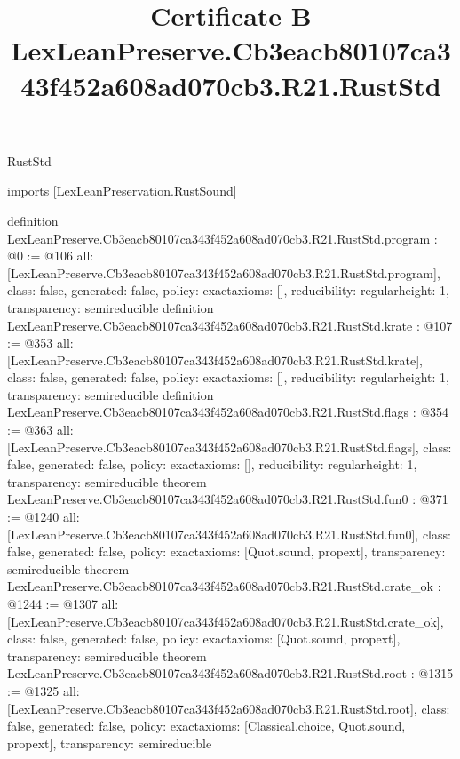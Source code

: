 \begin{lexlean}{RustStd}
\title{Certificate B LexLeanPreserve.Cb3eacb80107ca343f452a608ad070cb3.R21.RustStd}
\begin{coremodule}
imports [LexLeanPreservation.RustSound]

definition LexLeanPreserve.Cb3eacb80107ca343f452a608ad070cb3.R21.RustStd.program : @0 := @106 {
  all: [LexLeanPreserve.Cb3eacb80107ca343f452a608ad070cb3.R21.RustStd.program],
  class: false,
  generated: false,
  policy: exact{axioms: []},
  reducibility: regular{height: 1},
  transparency: semireducible
}
definition LexLeanPreserve.Cb3eacb80107ca343f452a608ad070cb3.R21.RustStd.krate : @107 := @353 {
  all: [LexLeanPreserve.Cb3eacb80107ca343f452a608ad070cb3.R21.RustStd.krate],
  class: false,
  generated: false,
  policy: exact{axioms: []},
  reducibility: regular{height: 1},
  transparency: semireducible
}
definition LexLeanPreserve.Cb3eacb80107ca343f452a608ad070cb3.R21.RustStd.flags : @354 := @363 {
  all: [LexLeanPreserve.Cb3eacb80107ca343f452a608ad070cb3.R21.RustStd.flags],
  class: false,
  generated: false,
  policy: exact{axioms: []},
  reducibility: regular{height: 1},
  transparency: semireducible
}
theorem LexLeanPreserve.Cb3eacb80107ca343f452a608ad070cb3.R21.RustStd.fun0 : @371 := @1240 {
  all: [LexLeanPreserve.Cb3eacb80107ca343f452a608ad070cb3.R21.RustStd.fun0],
  class: false,
  generated: false,
  policy: exact{axioms: [Quot.sound, propext]},
  transparency: semireducible
}
theorem LexLeanPreserve.Cb3eacb80107ca343f452a608ad070cb3.R21.RustStd.crate_ok : @1244 := @1307 {
  all: [LexLeanPreserve.Cb3eacb80107ca343f452a608ad070cb3.R21.RustStd.crate_ok],
  class: false,
  generated: false,
  policy: exact{axioms: [Quot.sound, propext]},
  transparency: semireducible
}
theorem LexLeanPreserve.Cb3eacb80107ca343f452a608ad070cb3.R21.RustStd.root : @1315 := @1325 {
  all: [LexLeanPreserve.Cb3eacb80107ca343f452a608ad070cb3.R21.RustStd.root],
  class: false,
  generated: false,
  policy: exact{axioms: [Classical.choice, Quot.sound, propext]},
  transparency: semireducible
}


\end{coremodule}
\end{lexlean}
